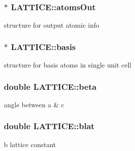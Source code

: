 \hypertarget{class_l_a_t_t_i_c_e_a529b0104c83d19577c69688fa247238c}{}
\subsubsection[{atoms\+Out}]{$\ast$ L\+A\+T\+T\+I\+C\+E\+::atoms\+Out}\label{class_l_a_t_t_i_c_e_a529b0104c83d19577c69688fa247238c}


structure for output atomic info 

\hypertarget{class_l_a_t_t_i_c_e_a6af830d3ced50888840f85a837a730e1}{}
\subsubsection[{basis}]{$\ast$ L\+A\+T\+T\+I\+C\+E\+::basis}\label{class_l_a_t_t_i_c_e_a6af830d3ced50888840f85a837a730e1}


structure for basis atoms in single unit cell 

\hypertarget{class_l_a_t_t_i_c_e_ad16b52e37b1f6f92598aec8940503bf3}{}
\subsubsection[{beta}]{\setlength{\rightskip}{0pt plus 5cm}double L\+A\+T\+T\+I\+C\+E\+::beta}\label{class_l_a_t_t_i_c_e_ad16b52e37b1f6f92598aec8940503bf3}


angle between {\ttfamily a \& c} 

\hypertarget{class_l_a_t_t_i_c_e_ae125b693205deca9ed500e9ece8c4f2d}{}
\subsubsection[{blat}]{\setlength{\rightskip}{0pt plus 5cm}double L\+A\+T\+T\+I\+C\+E\+::blat}\label{class_l_a_t_t_i_c_e_ae125b693205deca9ed500e9ece8c4f2d}


b lattice constant 

\hypertarget{class_l_a_t_t_i_c_e_aae495a347749c2380c73ecb89b955f3d}{}
